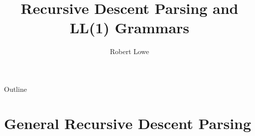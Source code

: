\documentclass[handout]{beamer}
\title{Recursive Descent Parsing and LL(1) Grammars}
\author{Robert Lowe}
\institute[Southeast Missouri State University] %
{
  Department of Computer Science\\
  Southeast Missouri State University
}
\date[]{}
\begin{document}
\begin{frame}
  \titlepage
\end{frame}

\begin{frame}{Outline}
  \tableofcontents
\end{frame}




\section{General Recursive Descent Parsing}
\end{document}
